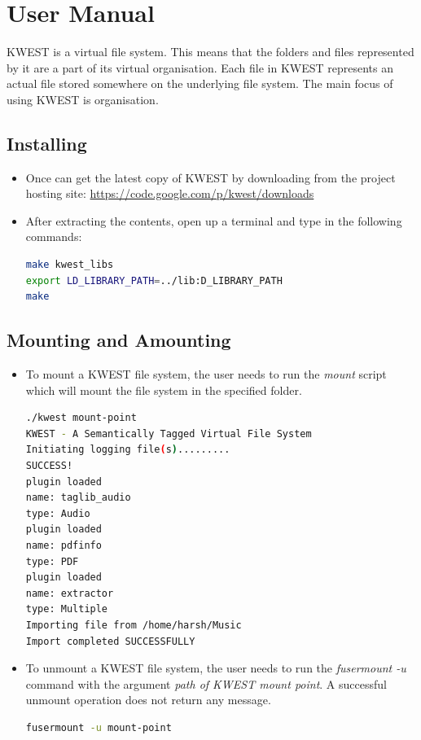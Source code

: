\setcounter{section}{0}
\chapter*{User Manual}

KWEST is a virtual file system. This means that the folders and files represented by it are a part of its virtual organisation. Each file in KWEST represents an actual file stored somewhere on the underlying file system. The main focus of using KWEST is organisation.

\section{Installing}
\begin{itemize}
\item Once can get the latest copy of KWEST by downloading from the project hosting site: \url{https://code.google.com/p/kwest/downloads}
\item After extracting the contents, open up a terminal and type in the following commands:
\begin{lstlisting}[language=bash,frame=single]
make kwest_libs
export LD_LIBRARY_PATH=../lib:D_LIBRARY_PATH
make
\end{lstlisting}
\end{itemize}

\section{Mounting and Amounting}

\begin{itemize}
\item To mount a KWEST file system, the user needs to run the \textit{mount} script which will mount the file system in the specified folder. 
\begin{lstlisting}[language=bash,frame=single]
./kwest mount-point
KWEST - A Semantically Tagged Virtual File System
Initiating logging file(s).........
SUCCESS!
plugin loaded
name: taglib_audio
type: Audio
plugin loaded
name: pdfinfo
type: PDF
plugin loaded
name: extractor
type: Multiple
Importing file from /home/harsh/Music
Import completed SUCCESSFULLY
\end{lstlisting}
\item To unmount a KWEST file system, the user needs to run the \textit{fusermount -u} command with the argument \textit{path of KWEST mount point}. A successful unmount operation does not return any message.
\begin{lstlisting}[language=bash,frame=single]
fusermount -u mount-point
\end{lstlisting}
\end{itemize}

